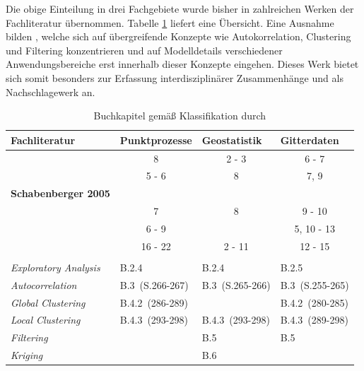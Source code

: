 Die obige Einteilung in drei Fachgebiete wurde bisher in zahlreichen Werken der Fachliteratur übernommen. 
Tabelle \ref{table_literature} liefert eine Übersicht. Eine Ausnahme 
bilden \cite{fischer_handbook_2010}, 
welche sich auf übergreifende Konzepte wie Autokorrelation, Clustering 
und Filtering konzentrieren 
und auf Modelldetails verschiedener Anwendungsbereiche erst 
innerhalb dieser Konzepte eingehen. Dieses Werk bietet sich somit besonders zur Erfassung 
interdisziplinärer Zusammenhänge und als Nachschlagewerk an.

\begin{table}[h!]
    \begin{center}
    \begin{tabular}{l l l l}
    \hline
        {\sc Fachliteratur}    & {\sc Punktprozesse} & {\sc Geostatistik} & {\sc Gitterdaten} \\
    \hline
        {\bf \cite{cressie_statistics_1993}}    & \multicolumn{1}{c}{8}  & \multicolumn{1}{c}{2 - 3} & \multicolumn{1}{c}{6 - 7} \\
        {\bf \cite{waller_applied_2004}}        & \multicolumn{1}{c}{5 - 6}  & \multicolumn{1}{c}{8} & \multicolumn{1}{c}{7, 9} \\
        {\bf Schabenberger 2005}        &   &   &   \\
        {\bf \cite{bivand_applied_2013}}        & \multicolumn{1}{c}{7}  & \multicolumn{1}{c}{8} & \multicolumn{1}{c}{9 - 10} \\
        {\bf \cite{anselin_perspectives_2010}}  & \multicolumn{1}{c}{6 - 9}  &   & \multicolumn{1}{c}{5, 10 - 13} \\
        {\bf \cite{gelfand_handbook_2010}}      & \multicolumn{1}{c}{16 - 22} & \multicolumn{1}{c}{2 - 11} & \multicolumn{1}{c}{12 - 15} \\
        {\bf \cite{fischer_handbook_2010}}  &                   &                   &   \\
    \cline{2-4}
        {\qquad \it Exploratory Analysis}  & B.2.4              & B.2.4             & B.2.5             \\
        {\qquad \it Autocorrelation}       & B.3 \,(S.266-267)  & B.3 \,(S.265-266) & B.3 \,(S.255-265) \\
        {\qquad \it Global Clustering}     & B.4.2 \,(286-289)  &                   & B.4.2 \,(280-285) \\
        {\qquad \it Local Clustering}      & B.4.3 \,(293-298)  & B.4.3 \,(293-298) & B.4.3 \,(289-298) \\
        {\qquad \it Filtering}             &                    & B.5               & B.5               \\
        {\qquad \it Kriging}               &                    & B.6               &                   \\
    \hline
    \end{tabular}
    \end{center}
    \caption{Buchkapitel gemäß Klassifikation durch \cite{cressie_statistics_1993}}
    \label{table_literature}
\end{table}
